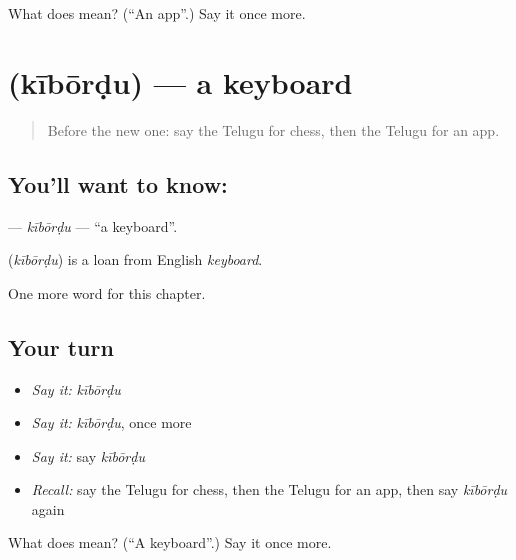 \begin{tcolorbox}[breakable,colback=teal!4,colframe=teal!35!black,title={Before you move on}]
What does  mean? (\textquotedblleft{}An app\textquotedblright{}.) Say it once more.
\end{tcolorbox}
\section[\texorpdfstring{\te{కీబోర్డు} (kībōrḍu)}{కీబోర్డు (kībōrḍu)}]{ (kībōrḍu) — a keyboard}

\label{lesson:TE-C305-kibordu}



\begin{quote}
Before the new one: say the Telugu for chess, then the Telugu for an app.
\end{quote}

\subsection*{You'll want to know: }
\textbf{} — \emph{kībōrḍu} — \textquotedblleft{}a keyboard\textquotedblright{}.

\begin{cousinweb}
\textbf{} (\emph{kībōrḍu}) is a loan from English \emph{keyboard}.
\end{cousinweb}

\begin{grammarlens}[title={What you've built}]
One more word for this chapter.
\end{grammarlens}

\subsection*{Your turn}
\begin{itemize}
\raggedright
  \item \emph{Say it:} \emph{kībōrḍu}
  \item \emph{Say it:} \emph{kībōrḍu}, once more
  \item \emph{Say it:} say \emph{kībōrḍu}
  \item \emph{Recall:} say the Telugu for chess, then the Telugu for an app, then say \emph{kībōrḍu} again
\end{itemize}

\begin{tcolorbox}[breakable,colback=teal!4,colframe=teal!35!black,title={Before you move on}]
What does  mean? (\textquotedblleft{}A keyboard\textquotedblright{}.) Say it once more.
\end{tcolorbox}
